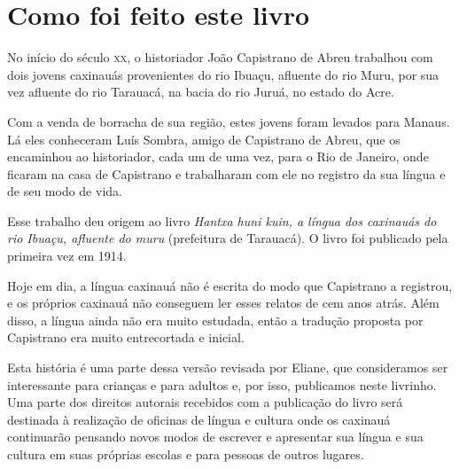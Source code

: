 \chapter{Como foi feito este livro}

No início do século \textsc{xx}, o historiador João Capistrano de Abreu trabalhou
com dois jovens caxinauás provenientes do rio Ibuaçu, afluente do rio Muru, por sua vez afluente do rio Tarauacá, na bacia do rio Juruá, no estado do Acre.

Com a venda de borracha de sua região, estes jovens foram levados para Manaus. Lá eles conheceram Luís Sombra, amigo de Capistrano de Abreu, que os encaminhou ao historiador, cada um de uma vez, para o Rio de Janeiro, onde ficaram na casa de Capistrano e trabalharam
com ele no registro da sua língua e de seu modo de vida.

Esse trabalho deu origem ao livro \textit{Hantxa huni kuin, a língua dos caxinauás do rio Ibuaçu, afluente do muru} (prefeitura de Tarauacá). O livro foi publicado pela primeira vez em 1914.

Hoje em dia, a língua caxinauá não é escrita do modo que Capistrano a
registrou, e os próprios caxinauá não conseguem ler esses relatos de
cem anos atrás. Além disso, a língua ainda não era muito estudada, então
a tradução proposta por Capistrano era muito entrecortada e inicial.



Esta história é uma parte dessa versão revisada por Eliane, que consideramos ser interessante para crianças e para adultos e, por isso, publicamos neste livrinho. Uma parte
dos direitos autorais recebidos com a publicação do livro será destinada à realização de oficinas de língua e cultura onde os caxinauá continuarão pensando novos modos de
escrever e apresentar sua língua e sua cultura em suas próprias escolas e para pessoas de outros lugares.


